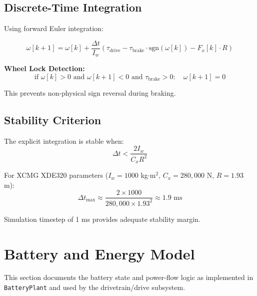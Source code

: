 \documentclass[11pt,a4paper]{article}
\begin{document}
\subsection{Discrete-Time Integration}

Using forward Euler integration:

\begin{equation}
\omega[k+1] = \omega[k] + \frac{\Delta t}{I_w} \left( \tau_{\text{drive}} - \tau_{\text{brake}} \cdot \text{sgn}(\omega[k]) - F_x[k] \cdot R \right)
\label{eq:wheel_integration}
\end{equation}

\textbf{Wheel Lock Detection:}
\begin{equation}
\text{if } \omega[k] > 0 \text{ and } \omega[k+1] < 0 \text{ and } \tau_{\text{brake}} > 0: \quad \omega[k+1] = 0
\end{equation}

This prevents non-physical sign reversal during braking.

\subsection{Stability Criterion}

The explicit integration is stable when:
\begin{equation}
\Delta t < \frac{2 I_w}{C_x R^2}
\end{equation}

For XCMG XDE320 parameters ($I_w = 1000$ kg$\cdot$m$^2$, $C_x = 280{,}000$ N, $R = 1.93$ m):
\begin{equation}
\Delta t_{\max} \approx \frac{2 \times 1000}{280{,}000 \times 1.93^2} \approx 1.9 \text{ ms}
\end{equation}

Simulation timestep of 1 ms provides adequate stability margin.




\section{Battery and Energy Model}
\label{sec:battery}

This section documents the battery state and power-flow logic as implemented in \texttt{BatteryPlant} and used by the drivetrain/drive subsystem.
\end{document}
